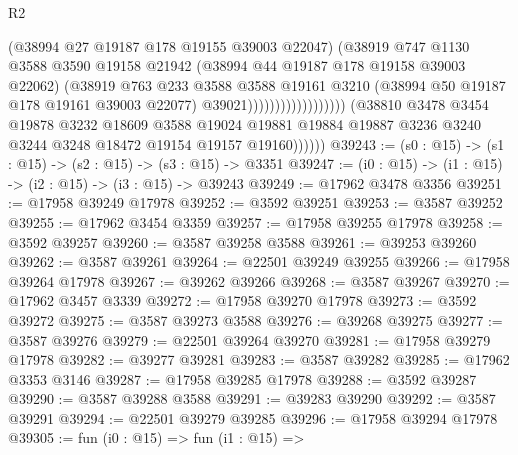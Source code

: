 \begin{lexlean}{R2}
\begin{coremodule}
                                              (@38994 @27 @19187 @178 @19155 @39003 @22047)
                                              (@38919
                                                @747
                                                @1130
                                                @3588
                                                @3590
                                                @19158
                                                @21942
                                                (@38994 @44 @19187 @178 @19158 @39003 @22062)
                                                (@38919
                                                  @763
                                                  @233
                                                  @3588
                                                  @3588
                                                  @19161
                                                  @3210
                                                  (@38994 @50 @19187 @178 @19161 @39003 @22077)
                                                  @39021))))))))))))))))))
              (@38810
                @3478
                @3454
                @19878
                @3232
                @18609
                @3588
                @19024
                @19881
                @19884
                @19887
                @3236
                @3240
                @3244
                @3248
                @18472
                @19154
                @19157
                @19160))))))
@39243 := (s0 : @15) -> (s1 : @15) -> (s2 : @15) -> (s3 : @15) -> @3351
@39247 := (i0 : @15) -> (i1 : @15) -> (i2 : @15) -> (i3 : @15) -> @39243
@39249 := @17962 @3478 @3356
@39251 := @17958 @39249 @17978
@39252 := @3592 @39251
@39253 := @3587 @39252
@39255 := @17962 @3454 @3359
@39257 := @17958 @39255 @17978
@39258 := @3592 @39257
@39260 := @3587 @39258 @3588
@39261 := @39253 @39260
@39262 := @3587 @39261
@39264 := @22501 @39249 @39255
@39266 := @17958 @39264 @17978
@39267 := @39262 @39266
@39268 := @3587 @39267
@39270 := @17962 @3457 @3339
@39272 := @17958 @39270 @17978
@39273 := @3592 @39272
@39275 := @3587 @39273 @3588
@39276 := @39268 @39275
@39277 := @3587 @39276
@39279 := @22501 @39264 @39270
@39281 := @17958 @39279 @17978
@39282 := @39277 @39281
@39283 := @3587 @39282
@39285 := @17962 @3353 @3146
@39287 := @17958 @39285 @17978
@39288 := @3592 @39287
@39290 := @3587 @39288 @3588
@39291 := @39283 @39290
@39292 := @3587 @39291
@39294 := @22501 @39279 @39285
@39296 := @17958 @39294 @17978
@39305 := fun (i0 : @15) =>
  fun (i1 : @15) =>

\end{coremodule}
\end{lexlean}
